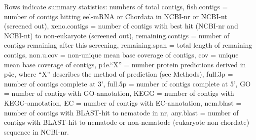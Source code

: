 \documentclass[10pt]{bmc_article}
\newenvironment{bmcformat}{\begin{raggedright}\baselineskip20pt\sloppy\setboolean{publ}{false}}{\end{raggedright}\baselineskip20pt\sloppy}
\begin{document}
\begin{bmcformat}
Rows indicate summary statistics: numbers of total contigs,
fish.contigs = number of contigs hitting eel-mRNA or Chordata in
NCBI-nr or NCBI-nt (screened out), xeno.contigs = number of contigs
with best hit (NCBI-nr and NCBI-nt) to non-eukaryote (screened out),
remaining.contigs = number of contigs remaining after this screening,
remaining.span = total length of remaining contigs, non.u.cov =
non-unique mean base coverage of contigs, cov = unique mean base
coverage of contigs, p4e.``X'' = number protein predictions derived in
p4e, where ``X'' describes the method of prediction (see Methods),
full.3p = number of contigs complete at 3', full.5p = number of
contigs complete at 5', GO = number of contigs with GO-annotation,
KEGG = number of contigs with KEGG-annotation, EC = number of contigs
with EC-annotation, nem.blast = number of contigs with BLAST-hit to
nematode in nr, any.blast = number of contigs with BLAST-hit to
nematode or non-nematode (eukaryote non chordate) sequence in NCBI-nr.



\end{bmcformat}
\end{document}
